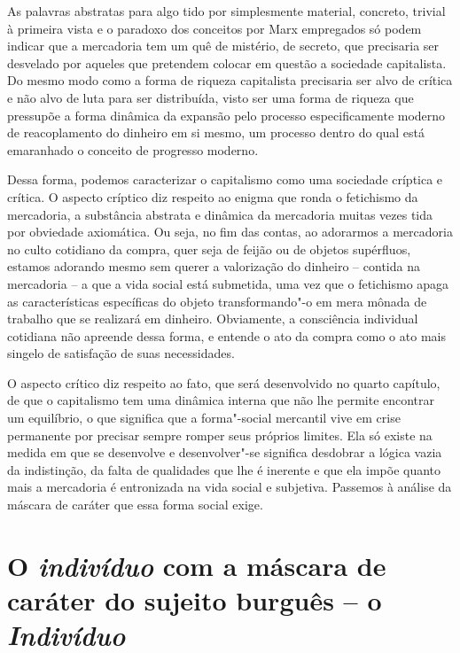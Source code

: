 As palavras abstratas para algo tido por simplesmente material,
concreto, trivial à primeira vista e o paradoxo dos conceitos por Marx
empregados só podem indicar que a mercadoria tem um quê de mistério, de
secreto, que precisaria ser desvelado por aqueles que pretendem colocar
em questão a sociedade capitalista. Do mesmo modo como a forma de
riqueza capitalista precisaria ser alvo de crítica e não alvo de luta
para ser distribuída, visto ser uma forma de riqueza que pressupõe a
forma dinâmica da expansão pelo processo especificamente moderno de
reacoplamento do dinheiro em si mesmo, um processo dentro do qual está
emaranhado o conceito de progresso moderno.

Dessa forma, podemos caracterizar o capitalismo como uma sociedade
críptica e crítica. O aspecto críptico diz respeito ao enigma que ronda
o fetichismo da mercadoria, a substância abstrata e dinâmica da
mercadoria muitas vezes tida por obviedade axiomática. Ou seja, no fim
das contas, ao adorarmos a mercadoria no culto cotidiano da compra, quer
seja de feijão ou de objetos supérfluos, estamos adorando mesmo sem
querer a valorização do dinheiro -- contida na mercadoria -- a que a
vida social está submetida, uma vez que o fetichismo apaga as
características específicas do objeto transformando"-o em mera mônada de
trabalho que se realizará em dinheiro. Obviamente, a consciência
individual cotidiana não apreende dessa forma, e entende o ato da compra
como o ato mais singelo de satisfação de suas necessidades.

O aspecto crítico diz respeito ao fato, que será desenvolvido no quarto
capítulo, de que o capitalismo tem uma dinâmica interna que não lhe
permite encontrar um equilíbrio, o que significa que a forma"-social
mercantil vive em crise permanente por precisar sempre romper seus
próprios limites. Ela só existe na medida em que se desenvolve e
desenvolver"-se significa desdobrar a lógica vazia da indistinção, da
falta de qualidades que lhe é inerente e que ela impõe quanto mais a
mercadoria é entronizada na vida social e subjetiva. Passemos à análise
da máscara de caráter que essa forma social exige.

\section{O \emph{indivíduo} com a máscara de caráter do sujeito burguês -- o \emph{Indivíduo}}

